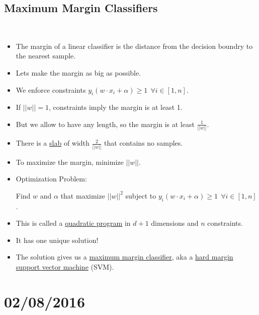 \documentclass[10pt]{article}
\begin{document}
	\subsection*{Maximum Margin Classifiers}
		\
		\begin{itemize}
			\item The margin of a linear classifier is the distance from the decision boundry to the nearest sample.
			\item Lets make the margin as big as possible.
				\begin{center}
				\end{center}
			\item We enforce constraints $y_{i}(w \cdot x_{i} + \alpha) \geq 1 \ \ \forall i \in [1, n]$.
			\item If $||w|| = 1$, constraints imply the margin is at least 1.
			\item But we allow to have any length, so the margin is at least $\frac{1}{||w||}$.
			\item There is a \underline{slab} of width $\frac{2}{||w||}$ that contains no samples.
			\item To maximize the margin, minimize $||w||$.
			\item Optimization Problem:
				\begin{center}
					Find $w$ and $\alpha$ that maximize $||w||^{2}$ subject to $y_{i}(w \cdot x_{i} + \alpha) \geq 1 \ \ \forall i \in [1, n]$.
				\end{center}
			\item This is called a \underline{quadratic program} in $d+1$ dimensions and $n$ constraints.
			\item It has one unique solution!
			\item The solution gives us a \underline{maximum margin classifier}, aka a \underline{hard margin support vector machine} (SVM).
		\end{itemize}

\newpage
\section*{02/08/2016}
\end{document}
